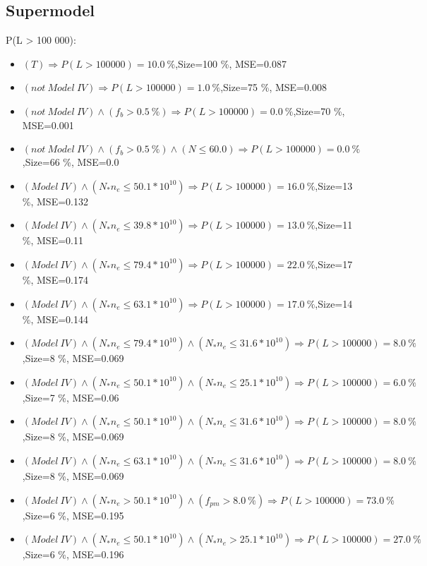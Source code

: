 \documentclass[numbered]{CSL}
\begin{document}
\subsection{Supermodel}
P(L > 100 000):
\begin{itemize}
\item $(T) \Rightarrow P(L > 100 000) = 10.0~\%$,\hfill Size=100 \%, MSE=0.087
\item $(not~Model~IV) \Rightarrow P(L > 100 000) = 1.0~\%$,\hfill Size=75 \%, MSE=0.008
\item $(not~Model~IV) \land (f_b > 0.5~\%) \Rightarrow P(L > 100 000) = 0.0~\%$,\hfill Size=70 \%, MSE=0.001
\item $(not~Model~IV) \land (f_b > 0.5~\%) \land (N \leq 60.0) \Rightarrow P(L > 100 000) = 0.0~\%$,\hfill Size=66 \%, MSE=0.0
\item $(Model~IV) \land (N_* n_e \leq 50.1 * 10^{10}) \Rightarrow P(L > 100 000) = 16.0~\%$,\hfill Size=13 \%, MSE=0.132
\item $(Model~IV) \land (N_* n_e \leq 39.8 * 10^{10}) \Rightarrow P(L > 100 000) = 13.0~\%$,\hfill Size=11 \%, MSE=0.11
\item $(Model~IV) \land (N_* n_e \leq 79.4 * 10^{10}) \Rightarrow P(L > 100 000) = 22.0~\%$,\hfill Size=17 \%, MSE=0.174
\item $(Model~IV) \land (N_* n_e \leq 63.1 * 10^{10}) \Rightarrow P(L > 100 000) = 17.0~\%$,\hfill Size=14 \%, MSE=0.144
\item $(Model~IV) \land (N_* n_e \leq 79.4 * 10^{10}) \land (N_* n_e \leq 31.6 * 10^{10}) \Rightarrow P(L > 100 000) = 8.0~\%$,\hfill Size=8 \%, MSE=0.069
\item $(Model~IV) \land (N_* n_e \leq 50.1 * 10^{10}) \land (N_* n_e \leq 25.1 * 10^{10}) \Rightarrow P(L > 100 000) = 6.0~\%$,\hfill Size=7 \%, MSE=0.06
\item $(Model~IV) \land (N_* n_e \leq 50.1 * 10^{10}) \land (N_* n_e \leq 31.6 * 10^{10}) \Rightarrow P(L > 100 000) = 8.0~\%$,\hfill Size=8 \%, MSE=0.069
\item $(Model~IV) \land (N_* n_e \leq 63.1 * 10^{10}) \land (N_* n_e \leq 31.6 * 10^{10}) \Rightarrow P(L > 100 000) = 8.0~\%$,\hfill Size=8 \%, MSE=0.069
\item $(Model~IV) \land (N_* n_e > 50.1 * 10^{10}) \land (f_{pm} > 8.0~\%) \Rightarrow P(L > 100 000) = 73.0~\%$,\hfill Size=6 \%, MSE=0.195
\item $(Model~IV) \land (N_* n_e \leq 50.1 * 10^{10}) \land (N_* n_e > 25.1 * 10^{10}) \Rightarrow P(L > 100 000) = 27.0~\%$,\hfill Size=6 \%, MSE=0.196

\end{itemize}
\end{document}
